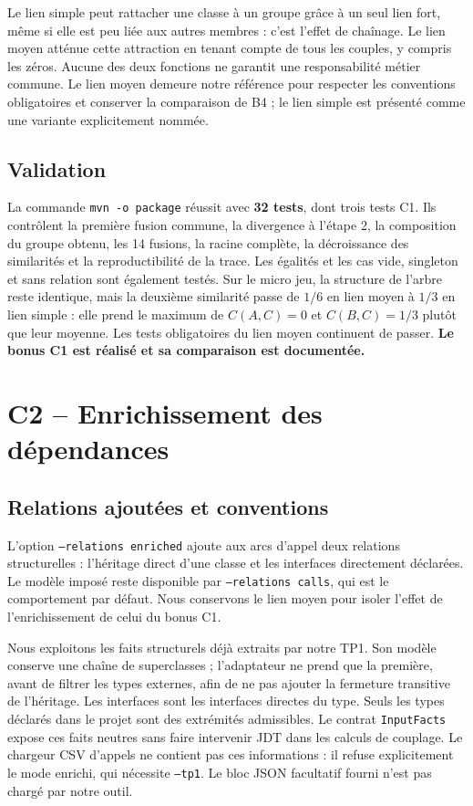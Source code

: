 \documentclass[11pt,a4paper]{article}
\begin{document}
Le lien simple peut rattacher une classe à un groupe grâce à un seul lien fort,
même si elle est peu liée aux autres membres : c'est l'effet de chaînage.
Le lien moyen atténue cette attraction en tenant compte de tous les couples,
y compris les zéros. Aucune des deux fonctions ne garantit une responsabilité
métier commune. Le lien moyen demeure notre référence pour respecter les
conventions obligatoires et conserver la comparaison de B4 ; le lien simple
est présenté comme une variante explicitement nommée.

\subsection{Validation}
La commande \texttt{mvn -o package} réussit avec \textbf{32 tests}, dont trois
tests C1. Ils contrôlent la première fusion commune, la divergence à l'étape 2,
la composition du groupe obtenu, les 14 fusions, la racine complète,
la décroissance des similarités et la reproductibilité de la trace.
Les égalités et les cas vide, singleton et sans relation sont également testés.
Sur le micro jeu, la structure de l'arbre reste identique, mais la deuxième
similarité passe de $1/6$ en lien moyen à $1/3$ en lien simple : elle prend le
maximum de $C(A,C)=0$ et $C(B,C)=1/3$ plutôt que leur moyenne.
Les tests obligatoires du lien moyen continuent de passer.
\textbf{Le bonus C1 est réalisé et sa comparaison est documentée.}

\section{C2 -- Enrichissement des dépendances}
\subsection{Relations ajoutées et conventions}
L'option \texttt{--relations enriched} ajoute aux arcs d'appel deux relations
structurelles : l'héritage direct d'une classe et les interfaces directement
déclarées. Le modèle imposé reste disponible par \texttt{--relations calls},
qui est le comportement par défaut. Nous conservons le lien moyen pour isoler
l'effet de l'enrichissement de celui du bonus C1.

Nous exploitons les faits structurels déjà extraits par notre TP1. Son modèle
conserve une chaîne de superclasses ; l'adaptateur ne prend que la première,
avant de filtrer les types externes, afin de ne pas ajouter la fermeture
transitive de l'héritage. Les interfaces sont les interfaces directes du type.
Seuls les types déclarés dans le projet sont des extrémités admissibles.
Le contrat \texttt{InputFacts} expose ces faits neutres sans faire intervenir
JDT dans les calculs de couplage. Le chargeur CSV d'appels ne contient pas ces
informations : il refuse explicitement le mode enrichi, qui nécessite
\texttt{--tp1}. Le bloc JSON facultatif fourni n'est pas chargé par notre outil.
\end{document}
